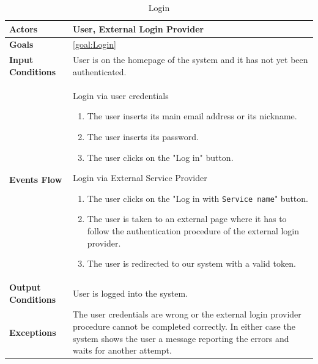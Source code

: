 \begin{table}[H]
	\centering
	\def\arraystretch{1.5}
	\begin{tabular}{|p{7cm}|p{7cm}|}
		\hline
		\textbf{Actors}            & User, External Login Provider		    \\ \hline
		\textbf{Goals}             & \ref{goal:Login}           \\ \hline
		\textbf{Input Conditions}  & User is on the homepage of the system and it has not yet been authenticated.           \\ \hline
		\textbf{Events Flow}       &    
		 	Login via user credentials
			 	\begin{enumerate}
			 		\item The user inserts its main email address or its nickname.
			 		\item The user inserts its password.
			 		\item The user clicks on the "Log in" button.
			 	\end{enumerate}
		 	Login via External Service Provider
			 	\begin{enumerate}
				 	\item The user clicks on the "Log in with \texttt{Service name}" button.
				 	\item The user is taken to an external page where it has to follow the authentication procedure of the external login provider.
				 	\item The user is redirected to our system with a valid token.
			 	\end{enumerate} \\ \hline
		\textbf{Output Conditions} & User is logged into the system.          \\ \hline
		\textbf{Exceptions}        & The user credentials are wrong or the external login provider procedure cannot be completed correctly. In either case the system shows the user a message reporting the errors and waits for another attempt.         \\ \hline
	\end{tabular}
	\caption{Login}
\end{table}

